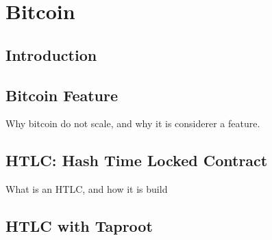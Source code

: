 \chapter{Bitcoin}

\section{Introduction}

\section{Bitcoin Feature}

Why bitcoin do not scale, and why it is considerer a feature.

\section{HTLC: Hash Time Locked Contract}

What is an HTLC, and how it is build

\section{HTLC with Taproot}
